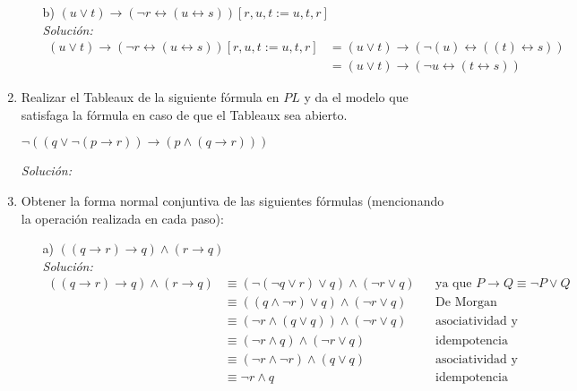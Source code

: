 \documentclass[letterpaper,11pt]{article}
\begin{document}
\begin{enumerate}
\begin{itemize}
            \item[b)] $(u \lor t) \rightarrow 
            (\neg r \leftrightarrow (u \leftrightarrow s))[r, u, t := u, t, r]$ \\
            \textit{Solución:}
            \begin{align*}
                (u \lor t) \rightarrow (\neg r \leftrightarrow (u \leftrightarrow s))
                [r, u, t := u, t, r]
                &= (u \lor t) \rightarrow (\neg (u) \leftrightarrow ((t) \leftrightarrow s)) \\
                &= (u \lor t) \rightarrow (\neg u \leftrightarrow (t \leftrightarrow s))
            \end{align*}

        \end{itemize}

        \item Realizar el Tableaux de la siguiente fórmula en $PL$ y da el
        modelo que satisfaga la fórmula en caso de que el Tableaux sea 
        abierto.
        \begin{center}
            $\neg ((q \lor \neg (p \rightarrow r)) 
            \rightarrow (p \land (q \rightarrow r)))$
        \end{center}
        \textit{Solución:}

        \item Obtener la forma normal conjuntiva de las siguientes fórmulas
        (mencionando la operación realizada en cada paso):
        \begin{itemize}
            
            \item[a)] $((q \rightarrow r) \rightarrow q) 
            \land (r \rightarrow q)$ \\
            \textit{Solución:}
            \begin{align*}
                ((q \rightarrow r) \rightarrow q) \land (r \rightarrow q)
                &\equiv (\neg (\neg q \lor r) \lor q) \land (\neg r \lor q)
                && \text{ya que $P \rightarrow Q \equiv \neg P \lor Q$} \\
                &\equiv ((q \land \neg r) \lor q) \land (\neg r \lor q)
                && \text{De Morgan} \\
                &\equiv (\neg r \land (q \lor q)) \land (\neg r \lor q)
                && \text{asociatividad y conmutatividad} \\
                &\equiv (\neg r \land q) \land (\neg r \lor q)
                && \text{idempotencia} \\
                &\equiv (\neg r \land \neg r) \land (q \lor q)
                && \text{asociatividad y conmutatividad}\\
                &\equiv \neg r \land q
                && \text{idempotencia}
            \end{align*}


\end{itemize}
\end{enumerate}
\end{document}
